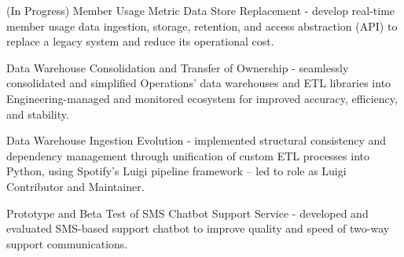 \documentclass[letter,10pt]{article}
\begin{document}
\vspace{5pt}

\begin{zitemize}
    \item (In Progress) Member Usage Metric Data Store Replacement - develop real-time member usage data ingestion, storage, retention, and access abstraction (API) to replace a legacy system and reduce its operational cost.
    \item Data Warehouse Consolidation and Transfer of Ownership - seamlessly consolidated and simplified Operations’ data warehouses and ETL libraries into Engineering-managed and monitored ecosystem for improved accuracy, efficiency, and stability.
    \item Data Warehouse Ingestion Evolution - implemented structural consistency and dependency management through unification of custom ETL processes into Python, using Spotify’s Luigi pipeline framework -- led to role as Luigi Contributor and Maintainer.
    \item Prototype and Beta Test of SMS Chatbot Support Service - developed and evaluated SMS-based support chatbot to improve quality and speed of two-way support communications.
\end{zitemize}


\end{document}
